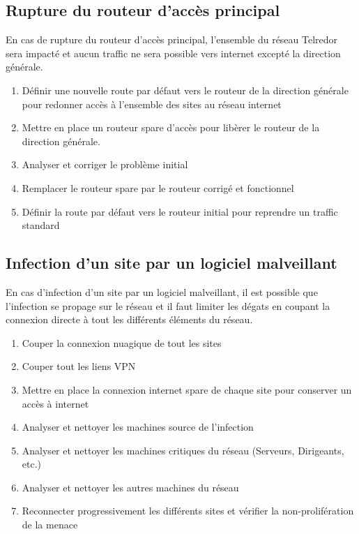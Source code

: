 \documentclass{article}
\newcommand{\tlr}{Telredor\xspace}
\begin{document}
\subsection{Rupture du routeur d'accès principal}

En cas de rupture du routeur d'accès principal, l'ensemble du réseau \tlr sera impacté et aucun traffic ne sera possible vers internet excepté la direction générale.

\bigskip

\begin{enumerate}
  \item Définir une nouvelle route par défaut vers le routeur de la direction générale pour redonner accès à l'ensemble des sites au réseau internet
  \item Mettre en place un routeur spare d'accès pour libèrer le routeur de la direction générale.
  \item Analyser et corriger le problème initial
  \item Remplacer le routeur spare par le routeur corrigé et fonctionnel
  \item Définir la route par défaut vers le routeur initial pour reprendre un traffic standard
\end{enumerate}

\subsection{Infection d'un site par un logiciel malveillant}

En cas d'infection d'un site par un logiciel malveillant, il est possible que l'infection se propage sur le réseau et il faut limiter les dégats en coupant la connexion directe à tout les différents éléments du réseau.

\bigskip

\begin{enumerate}
  \item Couper la connexion nuagique de tout les sites
  \item Couper tout les liens VPN
  \item Mettre en place la connexion internet spare de chaque site pour conserver un accès à internet
  \item Analyser et nettoyer les machines source de l'infection
  \item Analyser et nettoyer les machines critiques du réseau (Serveurs, Dirigeants, etc.)
  \item Analyser et nettoyer les autres machines du réseau
  \item Reconnecter progressivement les différents sites et vérifier la non-prolifération de la menace
\end{enumerate}
\end{document}
